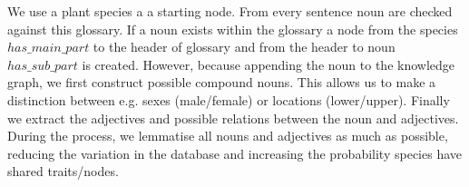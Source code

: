 \documentclass[a4paper, 12pt, oneside]{book} %
\begin{document}

We use a plant species a a starting node.
From every sentence noun are checked against this glossary.
If a noun exists within the glossary a node from the species $has\_main\_part$ to the header of glossary and from the header to noun $has\_sub\_part$ is created.
However, because appending the noun to the knowledge graph, we first construct possible compound nouns.
This allows us to make a distinction between e.g. sexes (male/female) or locations (lower/upper).
Finally we extract the adjectives and possible relations between the noun and adjectives.
During the process, we lemmatise all nouns and adjectives as much as possible, reducing the variation in the database and increasing the probability species have shared traits/nodes.
\end{document}
